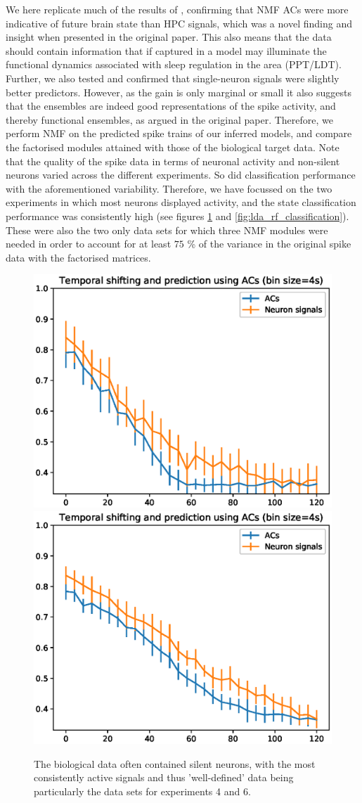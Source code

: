 \documentclass[mphil,deptreport,ianc]{infthesis} %
\begin{document}
We here replicate much of the results of \cite{Tsunematsu2019}, confirming that NMF ACs were more indicative of future brain state than HPC signals, which was a novel finding and insight when presented in the original paper.
This also means that the data should contain information that if captured in a model may illuminate the functional dynamics associated with sleep regulation in the area (PPT/LDT).
Further, we also tested and confirmed that single-neuron signals were slightly better predictors. 
However, as the gain is only marginal or small it also suggests that the ensembles are indeed good representations of the spike activity, and thereby functional ensembles, as argued in the original paper.
Therefore, we perform NMF on the predicted spike trains of our inferred models, and compare the factorised modules attained with those of the biological target data.
Note that the quality of the spike data in terms of neuronal activity and non-silent neurons varied across the different experiments.
So did classification performance with the aforementioned variability.
Therefore, we have focussed on the two experiments in which most neurons displayed activity, and the state classification performance was consistently high (see figures \ref{fig:lda_classification} and \ref{fig:lda_rf_classification}).
These were also the two only data sets for which three NMF modules were needed in order to account for at least $75$ \% of the variance in the original spike data with the factorised matrices.

\begin{figure}
    \centering
    \includegraphics[width=0.49\columnwidth]{figures/LDA/lda_temporal_shifting_and_prediction_bins_4_lda_acs_temporal_windows_4_exp_6.eps}
    \includegraphics[width=0.49\columnwidth]{figures/LDA/lda_temporal_shifting_and_prediction_bins_4_lda_acs_temporal_windows_4_exp_4.eps}
    \caption{The biological data often contained silent neurons, with the most consistently active signals and thus 'well-defined' data being particularly the data sets for experiments 4 and 6.}
    \label{fig:lda_classification}
\end{figure}
\end{document}
